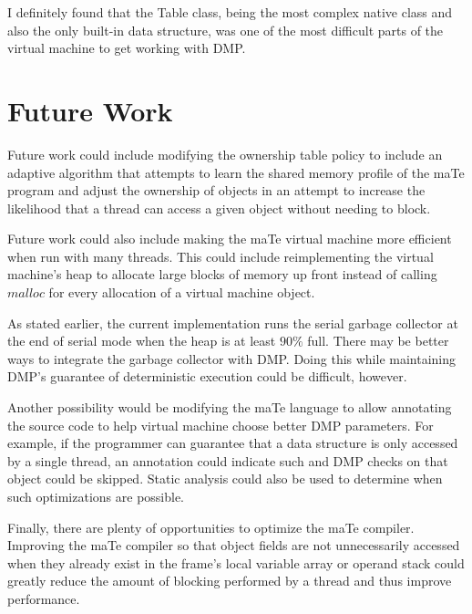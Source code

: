 
I definitely found that the Table class, being the most complex native
class and also the only built-in data structure, was one of the most
difficult parts of the virtual machine to get working with DMP.

\section{Future Work}

Future work could include modifying the ownership table policy to
include an adaptive algorithm that attempts to learn the shared memory
profile of the maTe program and adjust the ownership of objects in an
attempt to increase the likelihood that a thread can access a given
object without needing to block.

Future work could also include making the maTe virtual machine more
efficient when run with many threads.  This could include
reimplementing the virtual machine's heap to allocate large blocks of
memory up front instead of calling $malloc$ for every allocation of a
virtual machine object.

As stated earlier, the current implementation runs the serial garbage
collector at the end of serial mode when the heap is at least $90\%$
full.  There may be better ways to integrate the garbage collector
with DMP.  Doing this while maintaining DMP's guarantee of
deterministic execution could be difficult, however.

Another possibility would be modifying the maTe language to allow
annotating the source code to help virtual machine choose better DMP
parameters.  For example, if the programmer can guarantee that a data
structure is only accessed by a single thread, an annotation could
indicate such and DMP checks on that object could be skipped.  Static
analysis could also be used to determine when such optimizations are
possible.

Finally, there are plenty of opportunities to optimize the maTe
compiler.  Improving the maTe compiler so that object fields are not
unnecessarily accessed when they already exist in the frame's local
variable array or operand stack could greatly reduce the amount of
blocking performed by a thread and thus improve performance.

